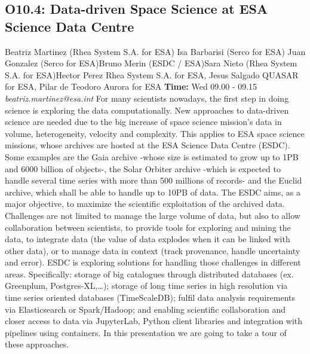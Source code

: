 \documentclass{report}
\begin{document}
\subsection*{O10.4: Data-driven Space Science at ESA Science Data Centre}
\bigskip
Beatriz Martinez (Rhea System S.A. for ESA) \newline Isa Barbarisi (Serco for ESA) \newline  Juan Gonzalez (Serco for ESA)\newline  Bruno Merin (ESDC / ESA)\newline Sara Nieto (Rhea System S.A. for ESA)\newline  Hector Perez Rhea System S.A. for ESA, Jesus Salgado QUASAR for ESA, Pilar de Teodoro Aurora for ESA\newline\newline
{\bf Time:} Wed 09.00 - 09.15\newline
\newline
{\it beatriz.martinez@esa.int}\newline
\newline\newline
For many scientists nowadays, the first step in doing science is exploring the data computationally. New approaches to data-driven science are needed due to the big increase of space science mission’s data in volume, heterogeneity, velocity and complexity. This applies to ESA space science missions, whose archives are hosted at the ESA Science Data Centre (ESDC). Some examples are the Gaia archive -whose size is estimated to grow up to 1PB and 6000 billion of objects-, the Solar Orbiter archive -which is expected to handle several time series with more than 500 millions of records- and the Euclid archive, which shall be able to handle up to 10PB of data.
The ESDC aims, as a major objective, to maximize the scientific exploitation of the archived data. Challenges are not limited to manage the large volume of data, but also to allow collaboration between scientists, to provide tools for exploring and mining the data, to integrate data (the value of data explodes when it can be linked with other data), or to manage data in context (track provenance, handle uncertainty and error).
ESDC is exploring solutions for handling those challenges in different areas. Specifically: storage of big catalogues through distributed databases (ex. Greenplum, Postgres-XL,…); storage of long time series in high resolution via time series oriented databases (TimeScaleDB); fulfil data analysis requirements via Elasticsearch or Spark/Hadoop; and enabling scientific collaboration and closer access to data via JupyterLab, Python client libraries and integration with pipelines using containers. In this presentation we are going to take a tour of these approaches.\newline
\newpage
\end{document}
